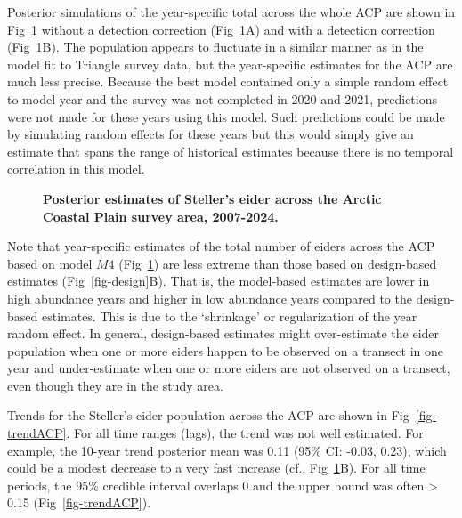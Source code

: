 \documentclass[
  10pt,
  letterpaper,
]{article}
\begin{document}
Posterior simulations of the year-specific total across the whole ACP
are shown in Fig~\ref{fig-yearACP} without a detection correction (Fig~\ref{fig-yearACP}A) and with a detection correction (Fig~\ref{fig-yearACP}B). The population appears to fluctuate in a similar manner as in the model fit to Triangle survey data, but the year-specific estimates for the ACP are much less precise. Because the best model contained only a simple random effect to model year and the survey was not completed in 2020 and 2021, predictions were not made for these years using this model. Such predictions could be made by simulating random effects for these years but this would simply give an estimate that spans the range of historical estimates because there is no temporal correlation in this model.

\begin{figure}

\caption{\label{fig-yearACP}\textbf{Posterior estimates of Steller's eider across the Arctic Coastal Plain survey area, 2007-2024.} }

\end{figure}%

Note that year-specific estimates of the total number of eiders across
the ACP based on model \(M4\) (Fig~\ref{fig-yearACP}) are less extreme than those based on design-based estimates (Fig~\ref{fig-design}B). That is, the model-based estimates are lower in high abundance years and higher
in low abundance years compared to the design-based estimates. This is
due to the `shrinkage' or regularization of the year random effect. In
general, design-based estimates might over-estimate the eider population
when one or more eiders happen to be observed on a transect in one year
and under-estimate when one or more eiders are not observed on a
transect, even though they are in the study area.

Trends for the Steller's eider population across the ACP are shown in
Fig~\ref{fig-trendACP}. For all time ranges (lags), the trend was not
well estimated. For example, the 10-year trend posterior mean was 0.11
(95\% CI: -0.03, 0.23), which could be a modest decrease to a very fast
increase (cf., Fig~\ref{fig-yearACP}B). For all time periods, the 95\%
credible interval overlaps 0 and the upper bound was often
\textgreater{} 0.15 (Fig~\ref{fig-trendACP}).
\end{document}
